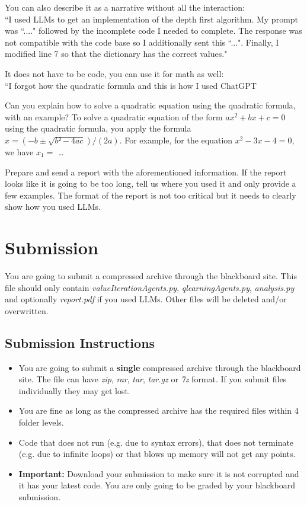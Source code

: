 \documentclass{article}
\begin{document}
You can also describe it as a narrative without all the interaction: \\
``I used LLMs to get an implementation of the depth first algorithm. 
My prompt was ``...." followed by the incomplete code I needed to complete. The response was not compatible with the code base so 
I additionally sent this ``...". Finally, I modified line 7 so that the dictionary has the correct values."

It does not have to be code, you can use it for math as well:\\
``I forgot how the quadratic formula and this is how I used ChatGPT
\begin{dialogue}
 Can you explain how to solve a quadratic equation using the quadratic formula, with an example?
 To solve a quadratic equation of the form $ax^2 + bx + c = 0$ using the quadratic formula, you apply the formula $x = (-b ± \sqrt{b²-4ac}) / (2a)$. 
For example, for the equation $x^2 - 3x - 4 = 0$, we have $x_1 = $ \ldots
\end{dialogue}

Prepare and send a report with the aforementioned information. If the report looks like it is going to be too long, tell us where you used it and only
provide a few examples. The format of the report is not too critical but it needs to clearly show how you used LLMs.


\section*{Submission}

You are going to submit a compressed archive through the blackboard site. 
This file should only contain \textit{valueIterationAgents.py}, \textit{qlearningAgents.py}, \textit{analysis.py} and optionally \textit{report.pdf} if you used LLMs. 
Other files will be deleted and/or overwritten. 


\subsection*{Submission Instructions} 
\begin{itemize}
 \item You are going to submit a \textbf{single} compressed archive through the blackboard site. 
 The file can have \textit{zip}, \textit{rar},  \textit{tar}, \textit{tar.gz} or \textit{7z} format. 
 If you submit files individually they may get lost.
 \item You are fine as long as the compressed archive has the required files within 4 folder levels.
 \item Code that does not run (e.g. due to syntax errors), that does not terminate (e.g. due to infinite loops) or that blows up memory will not get any
 points.
 \item \textbf{Important:} Download your submission to make sure it is not corrupted and it has your latest code. 
You are only going to be graded by your blackboard submission.
\end{itemize}
\end{document}
